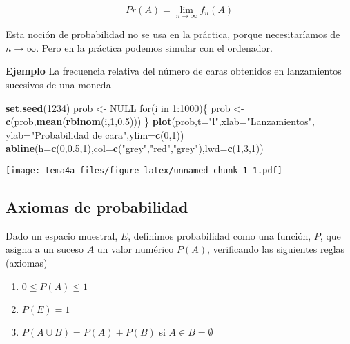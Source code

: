 \documentclass[]{article}
\newenvironment{Shaded}{\begin{snugshade}}{\end{snugshade}}
\newcommand{\KeywordTok}[1]{\textcolor[rgb]{0.13,0.29,0.53}{\textbf{{#1}}}}
\newcommand{\DataTypeTok}[1]{\textcolor[rgb]{0.13,0.29,0.53}{{#1}}}
\newcommand{\DecValTok}[1]{\textcolor[rgb]{0.00,0.00,0.81}{{#1}}}
\newcommand{\FloatTok}[1]{\textcolor[rgb]{0.00,0.00,0.81}{{#1}}}
\newcommand{\StringTok}[1]{\textcolor[rgb]{0.31,0.60,0.02}{{#1}}}
\newcommand{\OtherTok}[1]{\textcolor[rgb]{0.56,0.35,0.01}{{#1}}}
\newcommand{\NormalTok}[1]{{#1}}
\numberwithin{equation}{section}
\begin{document}
\[
    Pr(A) = \lim_{n\rightarrow \infty} f_n(A)
\]

Esta noción de probabilidad no se usa en la práctica, porque
necesitaríamos de \(n\rightarrow\infty\). Pero en la práctica podemos
simular con el ordenador.

\textbf{Ejemplo} La frecuencia relativa del número de caras obtenidos en
lanzamientos sucesivos de una moneda

\begin{Shaded}
\begin{Highlighting}[]
\KeywordTok{set.seed}\NormalTok{(}\DecValTok{1234}\NormalTok{)}
\NormalTok{prob <-}\StringTok{ }\OtherTok{NULL}
\NormalTok{for(i in }\DecValTok{1}\NormalTok{:}\DecValTok{1000}\NormalTok{)\{}
\NormalTok{prob <-}\StringTok{ }\KeywordTok{c}\NormalTok{(prob,}\KeywordTok{mean}\NormalTok{(}\KeywordTok{rbinom}\NormalTok{(i,}\DecValTok{1}\NormalTok{,}\FloatTok{0.5}\NormalTok{)))}
\NormalTok{\}}
\KeywordTok{plot}\NormalTok{(prob,}\DataTypeTok{t=}\StringTok{"l"}\NormalTok{,}\DataTypeTok{xlab=}\StringTok{"Lanzamientos"}\NormalTok{, }\DataTypeTok{ylab=}\StringTok{"Probabilidad de cara"}\NormalTok{,}\DataTypeTok{ylim=}\KeywordTok{c}\NormalTok{(}\DecValTok{0}\NormalTok{,}\DecValTok{1}\NormalTok{))}
\KeywordTok{abline}\NormalTok{(}\DataTypeTok{h=}\KeywordTok{c}\NormalTok{(}\DecValTok{0}\NormalTok{,}\FloatTok{0.5}\NormalTok{,}\DecValTok{1}\NormalTok{),}\DataTypeTok{col=}\KeywordTok{c}\NormalTok{(}\StringTok{"grey"}\NormalTok{,}\StringTok{"red"}\NormalTok{,}\StringTok{"grey"}\NormalTok{),}\DataTypeTok{lwd=}\KeywordTok{c}\NormalTok{(}\DecValTok{1}\NormalTok{,}\DecValTok{3}\NormalTok{,}\DecValTok{1}\NormalTok{))}
\end{Highlighting}
\end{Shaded}

\texttt{[image: tema4a\_files/figure-latex/unnamed-chunk-1-1.pdf]}

\subsection{Axiomas de probabilidad}\label{axiomas-de-probabilidad}

Dado un espacio muestral, \(E\), definimos probabilidad como una
función, \(P\), que asigna a un suceso \(A\) un valor numérico \(P(A)\),
verificando las siguientes reglas (axiomas)

\begin{enumerate}
\def\labelenumi{\arabic{enumi}.}
\item
  \(0\leq P(A) \leq 1\)
\item
  \(P(E)=1\)
\item
  \(P(A\cup B)=P(A)+P(B)\) si \(A\in B = \emptyset\)
\end{enumerate}
\end{document}
